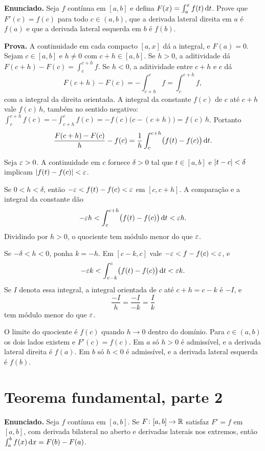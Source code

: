 \documentclass[11pt,a4paper]{article}
\begin{document}
\textbf{Enunciado.} Seja $f$ contínua em $[a,b]$ e defina $F(x)=\int_a^x f(t)\,\mathrm{d} t$. Prove que $F'(c)=f(c)$ para todo $c\in(a,b)$, que a derivada lateral direita em $a$ é $f(a)$ e que a derivada lateral esquerda em $b$ é $f(b)$.

\textbf{Prova.}
A continuidade em cada compacto $[a,x]$ dá a integral, e $F(a)=0$. Sejam $c\in[a,b]$ e $h\neq 0$ com $c+h\in[a,b]$. Se $h>0$, a aditividade dá $F(c+h)-F(c)=\int_c^{c+h}f$. Se $h<0$, a aditividade entre $c+h$ e $c$ dá
\[
F(c+h)-F(c)=-\int_{c+h}^c f=\int_c^{c+h}f,
\]
com a integral da direita orientada. A integral da constante $f(c)$ de $c$ até $c+h$ vale $f(c)\,h$, também no sentido negativo: $\int_c^{c+h}f(c)=-\int_{c+h}^c f(c)=-f(c)\bigl(c-(c+h)\bigr)=f(c)\,h$. Portanto
\[
\frac{F(c+h)-F(c)}{h}-f(c)
=\frac{1}{h}\int_c^{c+h}\bigl(f(t)-f(c)\bigr)\,\mathrm{d} t.
\]

Seja $\varepsilon>0$. A continuidade em $c$ fornece $\delta>0$ tal que $t\in[a,b]$ e $\left\lvert t-c \right\rvert<\delta$ implicam $\left\lvert f(t)-f(c) \right\rvert<\varepsilon$.

Se $0<h<\delta$, então $-\varepsilon<f(t)-f(c)<\varepsilon$ em $[c,c+h]$. A comparação e a integral da constante dão
\[
-\varepsilon h<\int_c^{c+h}\bigl(f(t)-f(c)\bigr)\,\mathrm{d} t<\varepsilon h.
\]
Dividindo por $h>0$, o quociente tem módulo menor do que $\varepsilon$.

Se $-\delta<h<0$, ponha $k=-h$. Em $[c-k,c]$ vale $-\varepsilon<f-f(c)<\varepsilon$, e
\[
-\varepsilon k<\int_{c-k}^c\bigl(f(t)-f(c)\bigr)\,\mathrm{d} t<\varepsilon k.
\]
Se $I$ denota essa integral, a integral orientada de $c$ até $c+h=c-k$ é $-I$, e
\[
\frac{-I}{h}=\frac{-I}{-k}=\frac{I}{k}
\]
tem módulo menor do que $\varepsilon$.

O limite do quociente é $f(c)$ quando $h\to 0$ dentro do domínio. Para $c\in(a,b)$ os dois lados existem e $F'(c)=f(c)$. Em $a$ só $h>0$ é admissível, e a derivada lateral direita é $f(a)$. Em $b$ só $h<0$ é admissível, e a derivada lateral esquerda é $f(b)$.

\section{Teorema fundamental, parte 2}

\textbf{Enunciado.} Seja $f$ contínua em $[a,b]$. Se $F\colon[a,b]\to\mathbb{R}$ satisfaz $F'=f$ em $[a,b]$, com derivada bilateral no aberto e derivadas laterais nos extremos, então $\int_a^b f(x)\,\mathrm{d} x=F(b)-F(a)$.
\end{document}
